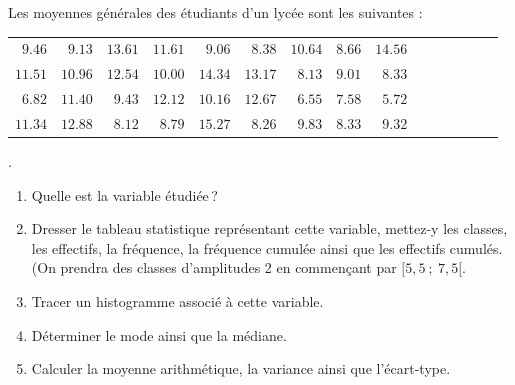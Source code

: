       \begin{exo}
            Les moyennes g\'en\'erales des \'etudiants d'un lyc\'ee sont les suivantes : \newline
            \begin{tabular}[b]{rrrrrrrrrrrrrrr}
                  $9.46$ & $9.13$ & $13.61$ & $11.61$ & $9.06$ & $8.38$ & $10.64$ & $8.66$ & $14.56$ \\
                  $11.51$ & $10.96$ & $12.54$ & $10.00$ & $14.34$ & $13.17$ & $8.13$ & $9.01$ & $8.33$ \\
                  $6.82$ & $11.40$ & $9.43$ & $12.12$ & $10.16$ & $12.67$ & $6.55$ & $7.58$ & $5.72$ \\
                  $11.34$ & $12.88$ & $8.12$ & $8.79$ & $15.27$ & $8.26$ & $9.83$ & $8.33$ & $9.32$ \\
            \end{tabular}.
            \begin{enumerate}
	                  \item Quelle est la variable \'etudi\'ee\,?
                  \item Dresser le tableau statistique repr\'esentant cette variable,
                        mettez-y les classes, les effectifs, la fr\'equence, la fr\'equence cumul\'ee ainsi que les effectifs cumul\'es.
                        (On prendra des classes d'amplitudes 2 en commen\c{c}ant par $[5,5 \ ; \ 7,5[$.
                  \item Tracer un histogramme associ\'e \`a cette variable.
                  \item D\'eterminer le mode ainsi que la m\'ediane.
                  \item Calculer la moyenne arithm\'etique, la variance ainsi que l'\'ecart-type.
            \end{enumerate}
      \end{exo}
